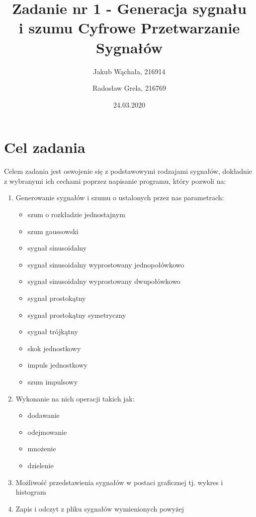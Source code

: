 \documentclass[12pt]{article}
\title{{\bf Zadanie nr 1 - Generacja sygnału\\ i szumu}\linebreak
Cyfrowe Przetwarzanie Sygnałów}
\author{Jakub Wąchała, 216914 \and Radosław Grela, 216769}
\date{24.03.2020}
\begin{document}
\clearpage\maketitle
\thispagestyle{empty}
\newpage
\setcounter{page}{1}
\section{Cel zadania}
\label{cel}
Celem zadania jest oswojenie się z podstawowymi rodzajami sygnałów, dokładnie z wybranymi ich cechami poprzez napisanie programu, który pozwoli na:
\begin{enumerate}
\item Generowanie sygnałów i szumu o ustalonych przez nas parametrach:
\begin{itemize}
\item szum o rozkładzie jednostajnym
\item szum gaussowski
\item sygnał sinusoidalny
\item sygnał sinusoidalny wyprostowany jednopołówkowo
\item sygnał sinusoidalny wyprostowany dwupołówkowo
\item sygnał prostokątny
\item sygnał prostokątny symetryczny
\item sygnał trójkątny
\item skok jednostkowy
\item impuls jednostkowy
\item szum impulsowy
\end{itemize}
\item Wykonanie na nich operacji takich jak:
\begin{itemize}
\item dodawanie
\item odejmowanie
\item mnożenie
\item dzielenie
\end{itemize}
\item Możliwość przedstawienia sygnałów w postaci graficznej tj. wykres i histogram
\item Zapis i odczyt z pliku sygnałów wymienionych powyżej
\end{enumerate}
\end{document}
